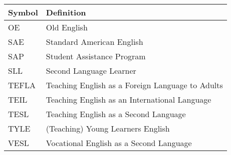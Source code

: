 \chapter*{}


\begin{table}[h!] 
\renewcommand\arraystretch{1.5} %
\begin{tabular}{p{5cm}p{10cm}}
\multicolumn{1}{l}{\textbf{Symbol}} & \multicolumn{1}{l}{\textbf{Definition}} \\ \hline 
OE & Old English \\ 
SAE & Standard American English \\ 
SAP & Student Assistance Program \\ 
SLL & Second Language Learner \\ 
TEFLA & Teaching English as a Foreign Language to Adults \\ 
TEIL & Teaching English as an International Language \\
 TESL & Teaching English as a Second Language \\ 
 TYLE & (Teaching) Young Learners English \\ 
 VESL & Vocational English as a Second Language \\ \hline
\end{tabular}
\caption*{} 
\label{tab:sym}
\end{table}